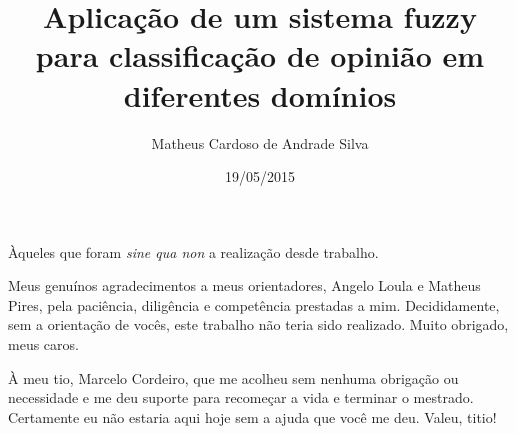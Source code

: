 \documentclass[msc, a4paper, classic, pt]{ufbathesis}
\title{Aplicação de um sistema fuzzy para classificação de opinião em diferentes domínios}
\date{19/05/2015}
\author{Matheus Cardoso de Andrade Silva}
\begin{document}
\frontpage

\frontmatter

\dmccpresentationpage

\catalogingsheet


\acknowledgements
Àqueles que foram \textit{sine qua non} a realização desde trabalho. 

Meus genuínos agradecimentos a meus orientadores, Angelo Loula e Matheus Pires, pela paciência, diligência e competência prestadas a mim. Decididamente, sem a orientação de vocês, este trabalho não teria sido realizado. Muito obrigado, meus caros.

À meu tio, Marcelo Cordeiro, que me acolheu sem nenhuma obrigação ou necessidade e me deu suporte para recomeçar a vida e terminar o mestrado. Certamente eu não estaria aqui hoje sem a ajuda que você me deu. Valeu, titio!
\end{document}
